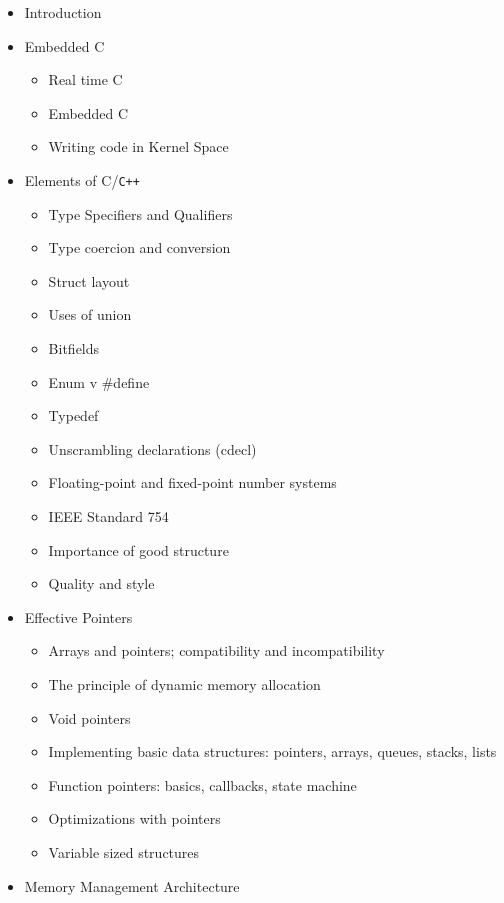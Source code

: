\documentclass[
]{article}
\providecommand{\tightlist}{%
  \setlength{\itemsep}{0pt}\setlength{\parskip}{0pt}}
\begin{document}
\begin{itemize}
\tightlist
\item
  Introduction
\item
  Embedded C

  \begin{itemize}
  \tightlist
  \item
    Real time C
  \item
    Embedded C
  \item
    Writing code in Kernel Space
  \end{itemize}
\item
  Elements of C/\texttt{C++}

  \begin{itemize}
  \tightlist
  \item
    Type Specifiers and Qualifiers
  \item
    Type coercion and conversion
  \item
    Struct layout
  \item
    Uses of union
  \item
    Bitfields
  \item
    Enum v \#define
  \item
    Typedef
  \item
    Unscrambling declarations (cdecl)
  \item
    Floating-point and fixed-point number systems
  \item
    IEEE Standard 754
  \item
    Importance of good structure
  \item
    Quality and style
  \end{itemize}
\item
  Effective Pointers

  \begin{itemize}
  \tightlist
  \item
    Arrays and pointers; compatibility and incompatibility
  \item
    The principle of dynamic memory allocation
  \item
    Void pointers
  \item
    Implementing basic data structures: pointers, arrays, queues,
    stacks, lists
  \item
    Function pointers: basics, callbacks, state machine
  \item
    Optimizations with pointers
  \item
    Variable sized structures
  \end{itemize}
\item
  Memory Management Architecture


\end{itemize}
\end{document}
